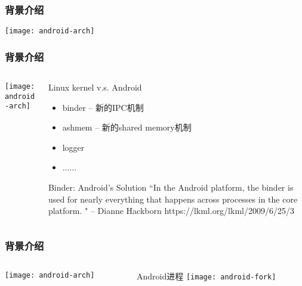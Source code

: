 \begin{frame}[plain]
	\frametitle{背景介绍}
	\centering
	\texttt{[image: android-arch]}
	
\end{frame}
\begin{frame}[fragile]
	\frametitle{背景介绍}
	
	\begin{columns}
		\begin{column}{.4\textwidth}
			
			\texttt{[image: android-arch]}
			
		\end{column}
		\begin{column}{.6\textwidth}
			Linux kernel v.s. Android
			\begin{itemize}
				\item binder -- 新的IPC机制
				\item ashmem -- 新的shared memory机制
				\item logger
				\item ......
			\end{itemize}
		
			\begin{block}{Binder: Android's Solution}
			“In the Android platform, the binder is used for
			nearly everything that happens across processes
			in the core platform. " – Dianne Hackborn
			https://lkml.org/lkml/2009/6/25/3
			
		\end{block} 
		\end{column}
	\end{columns}
\end{frame}


\begin{frame}[fragile]
	\frametitle{背景介绍}
	
	\begin{columns}
		\begin{column}{.4\textwidth}
			
			\texttt{[image: android-arch]}
			
		\end{column}
		\begin{column}{.6\textwidth}
			Android进程
			\texttt{[image: android-fork]}

		\end{column}
	\end{columns}
\end{frame}


